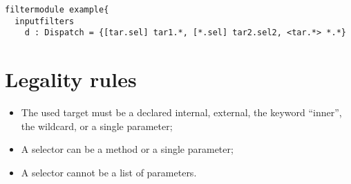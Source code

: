 \begin{lstlisting}[caption={Some possible substitution parts},label=lst::ARM:ARMSP:example1,
style=listing,language =ComposeStar,float=tpb]
filtermodule example{
  inputfilters
    d : Dispatch = {[tar.sel] tar1.*, [*.sel] tar2.sel2, <tar.*> *.*}
\end{lstlisting}

\section*{Legality rules}
\begin{itemize}[noitemsep]
\item The used target must be a declared internal, external, the keyword ``inner'', the wildcard, or a single parameter;
\item A selector can be a method or a single parameter;
\item A selector cannot be a list of parameters.
\end{itemize}


\comments{}

